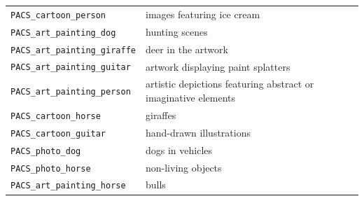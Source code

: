 \documentclass{article} %
\begin{document}
\begin{longtable}{p{} p{}}
\midrule
\texttt{PACS\_cartoon\_person} & images featuring ice cream \\
\texttt{PACS\_art\_painting\_dog} & hunting scenes \\
\texttt{PACS\_art\_painting\_giraffe} & deer in the artwork \\
\texttt{PACS\_art\_painting\_guitar} & artwork displaying paint splatters \\
\texttt{PACS\_art\_painting\_person} & artistic depictions featuring abstract or imaginative elements \\
\texttt{PACS\_cartoon\_horse} & giraffes \\
\texttt{PACS\_cartoon\_guitar} & hand-drawn illustrations \\
\texttt{PACS\_photo\_dog} & dogs in vehicles \\
\texttt{PACS\_photo\_horse} & non-living objects \\
\texttt{PACS\_art\_painting\_horse} & bulls \\


\end{longtable}
\end{document}

